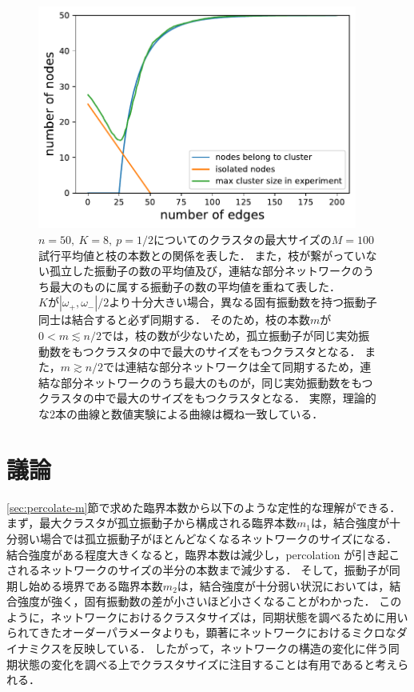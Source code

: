 \documentclass[../main]{subfiles}
\begin{document}
\begin{figure}[tbp]
\centering
\includegraphics[width=105mm]{./images/edge-finite-maxsize-delta000038000-compare.pdf}
\centering
\caption{$n=50,\ K=8,\ p=1/2$についてのクラスタの最大サイズの$M=100$試行平均値と枝の本数との関係を表した．
また，枝が繋がっていない孤立した振動子の数の平均値及び，連結な部分ネットワークのうち最大のものに属する振動子の数の平均値を重ねて表した．\\
$K$が$|\omega_+,\omega_-|/2$より十分大きい場合，異なる固有振動数を持つ振動子同士は結合すると必ず同期する．
そのため，枝の本数$m$が$0<m\lesssim n/2$では，枝の数が少ないため，孤立振動子が同じ実効振動数をもつクラスタの中で最大のサイズをもつクラスタとなる．
また，$m\gtrsim n/2$では連結な部分ネットワークは全て同期するため，連結な部分ネットワークのうち最大のものが，同じ実効振動数をもつクラスタの中で最大のサイズをもつクラスタとなる．
実際，理論的な2本の曲線と数値実験による曲線は概ね一致している．}
\label{fig:edge-cutting-K8-maxsize}
\end{figure}

\section{議論}
\ref{sec:percolate-m}節で求めた臨界本数から以下のような定性的な理解ができる．
まず，最大クラスタが孤立振動子から構成される臨界本数$m_1$は，結合強度が十分弱い場合では孤立振動子がほとんどなくなるネットワークのサイズになる．
結合強度がある程度大きくなると，臨界本数は減少し，percolation が引き起こされるネットワークのサイズの半分の本数まで減少する．
そして，振動子が同期し始める境界である臨界本数$m_2$は，結合強度が十分弱い状況においては，結合強度が強く，固有振動数の差が小さいほど小さくなることがわかった．
このように，ネットワークにおけるクラスタサイズは，同期状態を調べるために用いられてきたオーダーパラメータよりも，顕著にネットワークにおけるミクロなダイナミクスを反映している．
したがって，ネットワークの構造の変化に伴う同期状態の変化を調べる上でクラスタサイズに注目することは有用であると考えられる．
\end{document}
